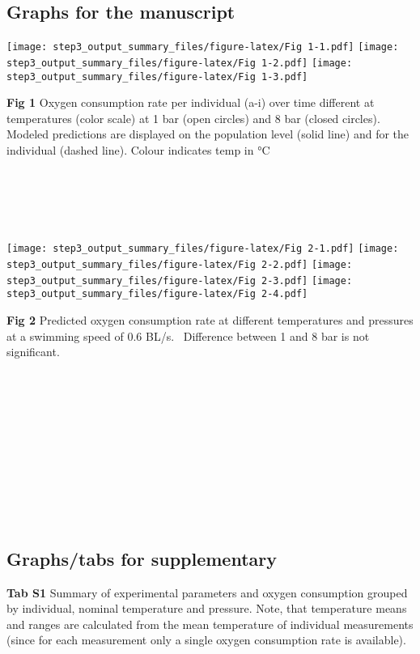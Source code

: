 \documentclass[
]{article}
\begin{document}
\hfill\break
\hfill\break
\hfill\break
\hfill\break
\hfill\break
\hfill\break
\hfill\break

\hypertarget{graphs-for-the-manuscript}{%
\subsection{Graphs for the manuscript}\label{graphs-for-the-manuscript}}

\texttt{[image: step3\_output\_summary\_files/figure-latex/Fig 1-1.pdf]}
\texttt{[image: step3\_output\_summary\_files/figure-latex/Fig 1-2.pdf]}
\texttt{[image: step3\_output\_summary\_files/figure-latex/Fig 1-3.pdf]}

\textbf{Fig 1} Oxygen consumption rate per individual (a-i) over time
different at temperatures (color scale) at 1 bar (open circles) and 8
bar (closed circles). Modeled predictions are displayed on the
population level (solid line) and for the individual (dashed line).
Colour indicates temp in °C\\
\strut \\
\strut \\
\strut \\

\texttt{[image: step3\_output\_summary\_files/figure-latex/Fig 2-1.pdf]}
\texttt{[image: step3\_output\_summary\_files/figure-latex/Fig 2-2.pdf]}
\texttt{[image: step3\_output\_summary\_files/figure-latex/Fig 2-3.pdf]}
\texttt{[image: step3\_output\_summary\_files/figure-latex/Fig 2-4.pdf]}

\textbf{Fig 2} Predicted oxygen consumption rate at different
temperatures and pressures at a swimming speed of 0.6 BL/s.~ Difference
between 1 and 8 bar is not significant.\\
\strut \\
\strut \\
\strut \\
\strut \\
\strut \\
\strut \\

\hypertarget{graphstabs-for-supplementary}{%
\subsection{Graphs/tabs for
supplementary}\label{graphstabs-for-supplementary}}

\textbf{Tab S1} Summary of experimental parameters and oxygen
consumption grouped by individual, nominal temperature and pressure.
Note, that temperature means and ranges are calculated from the mean
temperature of individual measurements (since for each measurement only
a single oxygen consumption rate is available).
\end{document}
